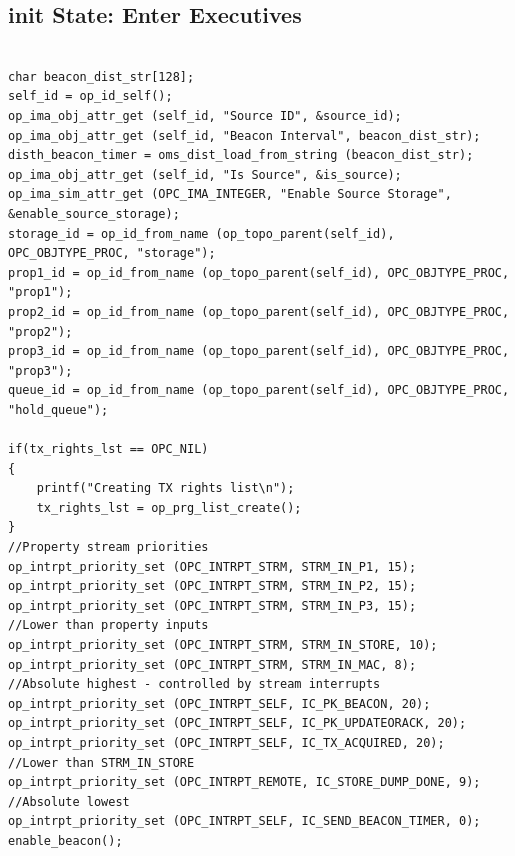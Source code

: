 \subsection{init State: Enter Executives}
{\tiny
\begin{verbatim}

char beacon_dist_str[128];
self_id = op_id_self();
op_ima_obj_attr_get (self_id, "Source ID", &source_id);
op_ima_obj_attr_get (self_id, "Beacon Interval", beacon_dist_str);
disth_beacon_timer = oms_dist_load_from_string (beacon_dist_str);
op_ima_obj_attr_get (self_id, "Is Source", &is_source);
op_ima_sim_attr_get (OPC_IMA_INTEGER, "Enable Source Storage", &enable_source_storage);
storage_id = op_id_from_name (op_topo_parent(self_id), OPC_OBJTYPE_PROC, "storage");
prop1_id = op_id_from_name (op_topo_parent(self_id), OPC_OBJTYPE_PROC, "prop1");
prop2_id = op_id_from_name (op_topo_parent(self_id), OPC_OBJTYPE_PROC, "prop2");
prop3_id = op_id_from_name (op_topo_parent(self_id), OPC_OBJTYPE_PROC, "prop3");
queue_id = op_id_from_name (op_topo_parent(self_id), OPC_OBJTYPE_PROC, "hold_queue");

if(tx_rights_lst == OPC_NIL)
{
	printf("Creating TX rights list\n");
	tx_rights_lst = op_prg_list_create();
}
//Property stream priorities
op_intrpt_priority_set (OPC_INTRPT_STRM, STRM_IN_P1, 15);
op_intrpt_priority_set (OPC_INTRPT_STRM, STRM_IN_P2, 15);
op_intrpt_priority_set (OPC_INTRPT_STRM, STRM_IN_P3, 15);
//Lower than property inputs
op_intrpt_priority_set (OPC_INTRPT_STRM, STRM_IN_STORE, 10);
op_intrpt_priority_set (OPC_INTRPT_STRM, STRM_IN_MAC, 8);
//Absolute highest - controlled by stream interrupts
op_intrpt_priority_set (OPC_INTRPT_SELF, IC_PK_BEACON, 20);
op_intrpt_priority_set (OPC_INTRPT_SELF, IC_PK_UPDATEORACK, 20);
op_intrpt_priority_set (OPC_INTRPT_SELF, IC_TX_ACQUIRED, 20);
//Lower than STRM_IN_STORE
op_intrpt_priority_set (OPC_INTRPT_REMOTE, IC_STORE_DUMP_DONE, 9);
//Absolute lowest
op_intrpt_priority_set (OPC_INTRPT_SELF, IC_SEND_BEACON_TIMER, 0);
enable_beacon();

\end{verbatim}
}

